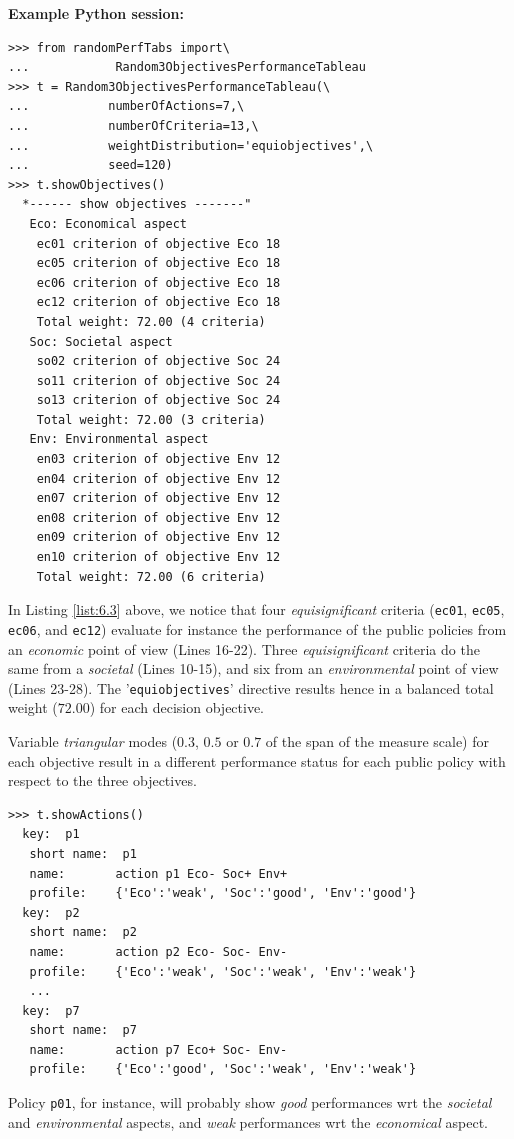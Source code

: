 \noindent \textbf{Example Python session:}
\begin{lstlisting}[caption={Generating a random 3 Objectives performance tableau},label=list:6.3]
>>> from randomPerfTabs import\
...            Random3ObjectivesPerformanceTableau
>>> t = Random3ObjectivesPerformanceTableau(\
...           numberOfActions=7,\
...           numberOfCriteria=13,\
...           weightDistribution='equiobjectives',\
...           seed=120)
>>> t.showObjectives()
  *------ show objectives -------"
   Eco: Economical aspect
    ec01 criterion of objective Eco 18
    ec05 criterion of objective Eco 18
    ec06 criterion of objective Eco 18
    ec12 criterion of objective Eco 18
    Total weight: 72.00 (4 criteria)
   Soc: Societal aspect
    so02 criterion of objective Soc 24
    so11 criterion of objective Soc 24
    so13 criterion of objective Soc 24
    Total weight: 72.00 (3 criteria)
   Env: Environmental aspect
    en03 criterion of objective Env 12
    en04 criterion of objective Env 12
    en07 criterion of objective Env 12
    en08 criterion of objective Env 12
    en09 criterion of objective Env 12
    en10 criterion of objective Env 12
    Total weight: 72.00 (6 criteria)
\end{lstlisting}
In Listing \ref{list:6.3} above, we notice that four \emph{equisignificant} criteria (\texttt{ec01}, \texttt{ec05}, \texttt{ec06}, and \texttt{ec12}) evaluate for instance the performance of the public policies from an \emph{economic} point of view (Lines 16-22). Three \emph{equisignificant} criteria do the same from a \emph{societal} (Lines 10-15), and six from an \emph{environmental} point of view (Lines 23-28). The '\texttt{equiobjectives}' directive results hence in a balanced total weight ($72.00$) for each decision objective. 

Variable \emph{triangular} modes ($0.3$, $0.5$ or $0.7$ of the span of the measure scale) for each objective result in a different performance status for each public policy with respect to the three objectives.
\begin{lstlisting}
>>> t.showActions()
  key:  p1
   short name:  p1
   name:       action p1 Eco- Soc+ Env+
   profile:    {'Eco':'weak', 'Soc':'good', 'Env':'good'}
  key:  p2
   short name:  p2
   name:       action p2 Eco- Soc- Env-
   profile:    {'Eco':'weak', 'Soc':'weak', 'Env':'weak'}
   ...
  key:  p7
   short name:  p7
   name:       action p7 Eco+ Soc- Env-
   profile:    {'Eco':'good', 'Soc':'weak', 'Env':'weak'}
\end{lstlisting}
Policy \texttt{p01}, for instance, will probably show \emph{good} performances wrt the \emph{societal} and \emph{environmental} aspects, and \emph{weak} performances wrt the \emph{economical} aspect.

